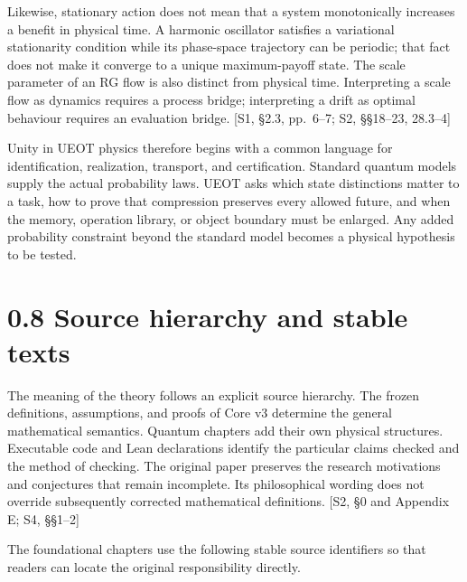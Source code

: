 \documentclass[
  11pt,
  oneside]{book}
\begin{document}
Likewise, stationary action does not mean that a system monotonically
increases a benefit in physical time. A harmonic oscillator satisfies a
variational stationarity condition while its phase-space trajectory can
be periodic; that fact does not make it converge to a unique
maximum-payoff state. The scale parameter of an RG flow is also distinct
from physical time. Interpreting a scale flow as dynamics requires a
process bridge; interpreting a drift as optimal behaviour requires an
evaluation bridge. {[}S1, §2.3, pp.~6--7; S2, §§18--23, 28.3--4{]}

Unity in UEOT physics therefore begins with a common language for
identification, realization, transport, and certification. Standard
quantum models supply the actual probability laws. UEOT asks which state
distinctions matter to a task, how to prove that compression preserves
every allowed future, and when the memory, operation library, or object
boundary must be enlarged. Any added probability constraint beyond the
standard model becomes a physical hypothesis to be tested.

\section{0.8 Source hierarchy and stable texts}

The meaning of the theory follows an explicit source hierarchy. The
frozen definitions, assumptions, and proofs of Core v3 determine the
general mathematical semantics. Quantum chapters add their own physical
structures. Executable code and Lean declarations identify the
particular claims checked and the method of checking. The original paper
preserves the research motivations and conjectures that remain
incomplete. Its philosophical wording does not override subsequently
corrected mathematical definitions. {[}S2, §0 and Appendix E; S4,
§§1--2{]}

The foundational chapters use the following stable source identifiers so
that readers can locate the original responsibility directly.
\end{document}
